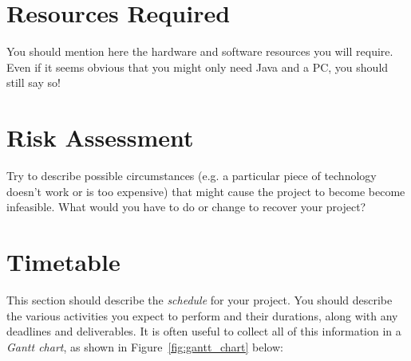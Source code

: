 \documentclass[a4paper,12pt]{article}
\begin{document}
\section*{Resources Required}

You should mention here the hardware and software resources you will
require. Even if it seems obvious that you might only need Java and a PC, 
you should still say so!


\section*{Risk Assessment}

Try to describe possible circumstances (e.g. a particular piece of
technology doesn't work or is too expensive) that might cause
the project to become become infeasible. What would you have to do
or change to recover your project?

\section*{Timetable}

This section should describe the {\em schedule} for your project. 
You should describe the various activities you expect to perform
and their durations, along with any deadlines and deliverables.
It is often useful to collect all of this information in a
{\em Gantt chart}, as shown in Figure~\ref{fig:gantt_chart} below:
\end{document}
